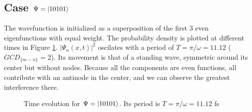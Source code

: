\documentclass{cis320}
\begin{document}
\subsection{Case $\Psi = \ket{10101}$}

The wavefunction is initialized as a superposition of the first 3 even eigenfunctions with equal weight. The probability density is plotted at different times in Figure \ref{fig:H10101}. $|\Psi_{n}(x,t)|^2$ oscilates with a period of $T=\pi/\omega=11.12$ ( $GCD_{\{m-n\}}=2$). Its movement is that of a standing wave, symmetric around its center but without nodes. Because all the components are even functions, all contribute with an antinode in the center, and we can observe the greatest interference there.
\begin{figure}[h!]
    \centering
    \caption{Time evolution for $\Psi = \ket{10101}$. Its period is $T=\pi/\omega=11.12$ fs}
    \label{fig:H10101}
\end{figure}
\end{document}
